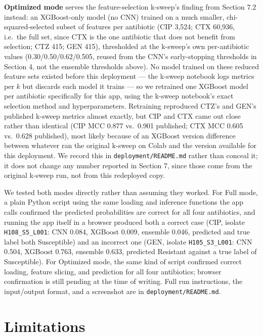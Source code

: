 \documentclass[11pt]{article}
\begin{document}
\textbf{Optimized mode} serves the feature-selection k-sweep's finding from Section 7.2 instead: an XGBoost-only model (no CNN) trained on a much smaller, chi-squared-selected subset of features per antibiotic (CIP 3,524; CTX 60,936, i.e.\ the full set, since CTX is the one antibiotic that does not benefit from selection; CTZ 415; GEN 415), thresholded at the k-sweep's own per-antibiotic values (0.30/0.50/0.62/0.505, reused from the CNN's early-stopping thresholds in Section 4, not the ensemble thresholds above). No model trained on these reduced feature sets existed before this deployment --- the k-sweep notebook logs metrics per $k$ but discards each model it trains --- so we retrained one XGBoost model per antibiotic specifically for this app, using the k-sweep notebook's exact selection method and hyperparameters. Retraining reproduced CTZ's and GEN's published k-sweep metrics almost exactly, but CIP and CTX came out close rather than identical (CIP MCC 0.877 vs.\ 0.901 published; CTX MCC 0.605 vs.\ 0.628 published), most likely because of an XGBoost version difference between whatever ran the original k-sweep on Colab and the version available for this deployment. We record this in \texttt{deployment/README.md} rather than conceal it; it does not change any number reported in Section 7, since those come from the original k-sweep run, not from this redeployed copy.

We tested both modes directly rather than assuming they worked. For Full mode, a plain Python script using the same loading and inference functions the app calls confirmed the predicted probabilities are correct for all four antibiotics, and running the app itself in a browser produced both a correct case (CIP, isolate \texttt{H108\_S5\_L001}: CNN 0.084, XGBoost 0.009, ensemble 0.046, predicted and true label both Susceptible) and an incorrect one (GEN, isolate \texttt{H105\_S3\_L001}: CNN 0.504, XGBoost 0.763, ensemble 0.633, predicted Resistant against a true label of Susceptible). For Optimized mode, the same kind of script confirmed correct loading, feature slicing, and prediction for all four antibiotics; browser confirmation is still pending at the time of writing. Full run instructions, the input/output format, and a screenshot are in \texttt{deployment/README.md}.

\section{Limitations}
\end{document}
